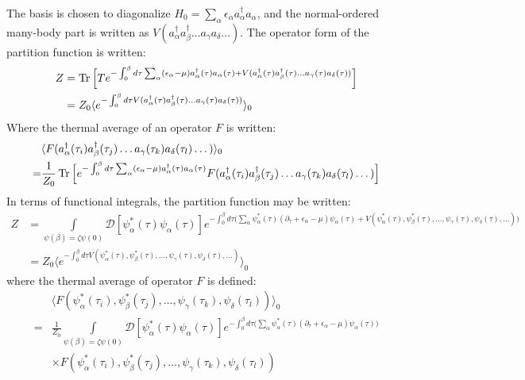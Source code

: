 \documentclass[12pt]{article}
\begin{document}
The basis is chosen to diagonalize 
$H_0=\sum_\alpha\epsilon_\alpha a^\dagger_\alpha a_\alpha$, and the normal-ordered
many-body part is written as 
$V(a^\dagger_\alpha a^\dagger_\beta\dots a_\gamma a_\delta\dots)$. The operator form 
of the partition function is written:
\begin{equation*}
    \begin{split}
        Z&=\Tr\Big[Te^{-\int_0^\beta d\tau\sum_\alpha(\epsilon_\alpha-\mu)
        a^\dagger_\alpha(\tau)a_\alpha(\tau)+V(a^\dagger_\alpha(\tau)
        a^\dagger_\beta(\tau)\dots a_\gamma(\tau)a_\delta(\tau))}\Big]\\
        &=Z_0\langle e^{-\int_0^\beta d\tau V(a^\dagger_\alpha(\tau)
        a^\dagger_\beta(\tau)\dots a_\gamma(\tau)a_\delta(\tau))}\rangle_0
    \end{split}
\end{equation*}
Where the thermal average of an operator $F$ is written:
\begin{equation*}
    \begin{split}
        &\langle F(a^\dagger_\alpha(\tau_i)a^\dagger_\beta(\tau_j)\dots
        a_\gamma(\tau_k)a_\delta(\tau_l)\dots)\rangle_0\\
        =&\frac{1}{Z_0}\Tr\Big[e^{-\int_0^\beta d\tau\sum_\alpha
        (\epsilon_\alpha-\mu)a^\dagger_\alpha(\tau)a_\alpha(\tau)}
        F(a^\dagger_\alpha(\tau_i)a^\dagger_\beta(\tau_j)\dots
        a_\gamma(\tau_k)a_\delta(\tau_l)\dots)\Big]
    \end{split}
\end{equation*}
In terms of functional integrals, the partition function may be written:
\begin{equation}
    \begin{split}
        Z&=\int\limits_{\psi(\beta)=\zeta\psi(0)}\mathcal{D}[\psi^*_\alpha(\tau)
        \psi_\alpha(\tau)]e^{-\int_0^\beta d\tau\big(\sum_\alpha\psi^*_\alpha(\tau)
        (\partial_\tau+\epsilon_\alpha-\mu)\psi_\alpha(\tau)+V(\psi^*_\alpha(\tau),
        \psi^*_\beta(\tau),\dots,\psi_\gamma(\tau),\psi_\delta(\tau),\dots)\big)}\\
        &=Z_0\langle e^{-\int_0^\beta d\tau V(\psi^*_\alpha(\tau),\psi^*_\beta
        (\tau),\dots,\psi_\gamma(\tau),\psi_\delta(\tau),\dots)}\rangle_0
    \end{split}
\end{equation}
where the thermal average of operator $F$ is defined:
\begin{equation*}
    \begin{split}
        &\langle F(\psi^*_\alpha(\tau_i),\psi^*_\beta(\tau_j),\dots,\psi_\gamma
        (\tau_k),\psi_\delta(\tau_l))\rangle_0\\
        =&\frac{1}{Z_0}\int\limits_{\psi(\beta)=\zeta\psi(0)}
        \mathcal{D}[\psi^*_\alpha(\tau)\psi_\alpha(\tau)]
        e^{-\int_0^\beta d\tau\big(\sum_\alpha\psi^*_\alpha(\tau)
        (\partial_\tau+\epsilon_\alpha-\mu)\psi_\alpha(\tau)\big)}\\
        &\times F(\psi^*_\alpha(\tau_i),\psi^*_\beta(\tau_j),\dots,\psi_\gamma(\tau_k)
        ,\psi_\delta(\tau_l))
    \end{split}
\end{equation*}
\end{document}
